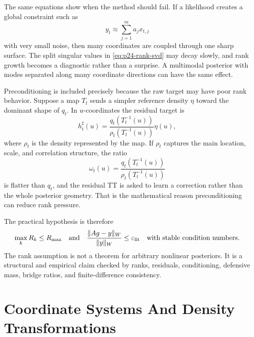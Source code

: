 \documentclass[11pt]{article}
\numberwithin{equation}{section}
\begin{document}
The same equations show when the method should fail.  If a likelihood creates
a global constraint such as
\begin{equation}
    y_t\approx \sum_{j=1}^m a_j x_{t,j}
    \label{eq:p24-rank-global-constraint}
\end{equation}
with very small noise, then many coordinates are coupled through one sharp
surface.  The split singular values in \eqref{eq:p24-rank-svd} may decay
slowly, and rank growth becomes a diagnostic rather than a surprise.  A
multimodal posterior with modes separated along many coordinate directions can
have the same effect.

Preconditioning is included precisely because the raw target may have poor
rank behavior.  Suppose a map \(T_t\) sends a simpler reference density
\(\eta\) toward the dominant shape of \(q_t\).  In \(u\)-coordinates the
residual target is
\begin{equation}
    h^\sharp_t(u)
    =
    \frac{q_t(T_t^{-1}(u))}
         {\rho_t(T_t^{-1}(u))}
    \eta(u),
    \label{eq:p24-rank-residual}
\end{equation}
where \(\rho_t\) is the density represented by the map.  If \(\rho_t\) captures
the main location, scale, and correlation structure, the ratio
\begin{equation}
    \omega_t(u)
    =
    \frac{q_t(T_t^{-1}(u))}
         {\rho_t(T_t^{-1}(u))}
    \label{eq:p24-rank-residual-ratio}
\end{equation}
is flatter than \(q_t\), and the residual TT is asked to learn a correction
rather than the whole posterior geometry.  That is the mathematical reason
preconditioning can reduce rank pressure.

The practical hypothesis is therefore
\begin{equation}
    \max_k R_k \le R_{\max}
    \quad\text{and}\quad
    \frac{\|A g-y\|_{W}}{\|y\|_{W}}\le\varepsilon_{\rm fit}
    \quad\text{with stable condition numbers}.
    \label{eq:p24-rank-diagnostic}
\end{equation}
The rank assumption is not a theorem for arbitrary nonlinear posteriors.  It
is a structural and empirical claim checked by ranks, residuals, conditioning,
defensive mass, bridge ratios, and finite-difference consistency.

\section{Coordinate Systems And Density Transformations}
\end{document}
